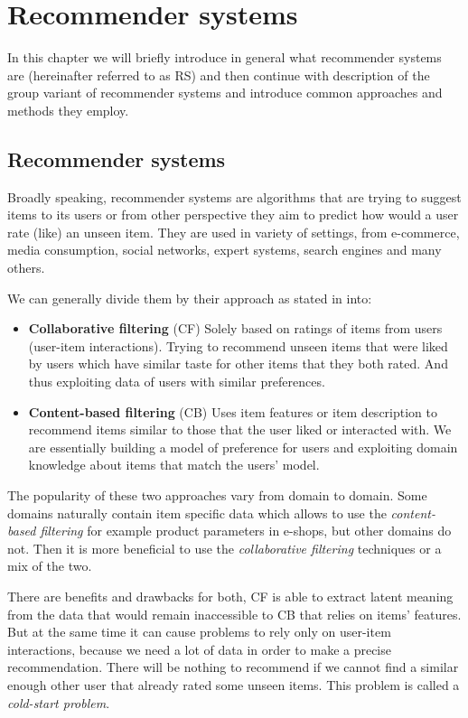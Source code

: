 \chapter{Recommender systems} \label{chap_recommender_systems}
In this chapter we will briefly introduce in general what recommender systems are (hereinafter referred to as RS) and then continue with description of the group variant of recommender systems and introduce common approaches and methods they employ.


\section{Recommender systems}
Broadly speaking, recommender systems are algorithms that are trying to suggest items to its users or from other perspective they aim to predict how would a user rate (like) an unseen item. They are used in variety of settings, from e-commerce, media consumption, social networks, expert systems, search engines and many others.

We can generally divide them by their approach as stated in \cite{ricci2011introduction} into:
\begin{itemize}
    \item \textbf{Collaborative filtering} (CF)\newline
        Solely based on ratings of items from users (user-item interactions). Trying to recommend unseen items that were liked by users which have similar taste for other items that they both rated. And thus exploiting data of users with similar preferences.
    \item  \textbf{Content-based filtering} (CB)\newline
        Uses item features or item description to recommend items similar to those that the user liked or interacted with. We are essentially building a model of preference for users and exploiting domain knowledge about items that match the users' model.
\end{itemize}

The popularity of these two approaches vary from domain to domain. Some domains naturally contain item specific data which allows to use the \textit{content-based filtering} for example product parameters in e-shops, but other domains do not. Then it is more beneficial to use the \textit{collaborative filtering} techniques or a mix of the two.

There are benefits and drawbacks for both, CF is able to extract latent meaning from the data that would remain inaccessible to CB that relies on items' features. But at the same time it can cause problems to rely only on user-item interactions, because we need a lot of data in order to make a precise recommendation. There will be nothing to recommend if we cannot find a similar enough other user that already rated some unseen items. This problem is called a \textit{cold-start problem}.\newline

